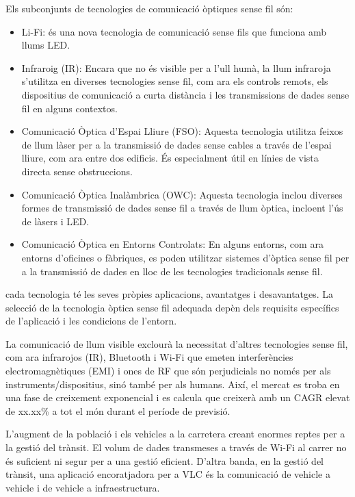 Els subconjunts de tecnologies de comunicació òptiques sense fil són:
\begin{itemize}
    \item Li-Fi: és una nova tecnologia de comunicació sense fils que funciona amb llums LED.
    \item Infraroig (IR): Encara que no és visible per a l'ull humà, la llum infraroja s'utilitza en diverses tecnologies sense fil, com ara els controls remots, els dispositius de comunicació a curta distància i les transmissions de dades sense fil en alguns contextos.
    \item Comunicació Òptica d'Espai Lliure (FSO): Aquesta tecnologia utilitza feixos de llum làser per a la transmissió de dades sense cables a través de l'espai lliure, com ara entre dos edificis. És especialment útil en línies de vista directa sense obstruccions.
    \item Comunicació Òptica Inalàmbrica (OWC): Aquesta tecnologia inclou diverses formes de transmissió de dades sense fil a través de llum òptica, incloent l'ús de làsers i LED.
    \item Comunicació Òptica en Entorns Controlats: En alguns entorns, com ara entorns d'oficines o fàbriques, es poden utilitzar sistemes d'òptica sense fil per a la transmissió de dades en lloc de les tecnologies tradicionals sense fil.
\end{itemize}

cada tecnologia té les seves pròpies aplicacions, avantatges i desavantatges. La selecció de la tecnologia òptica sense fil adequada depèn dels requisits específics de l'aplicació i les condicions de l'entorn.

La comunicació de llum visible exclourà la necessitat d'altres tecnologies sense fil, com ara infrarojos (IR), Bluetooth i Wi-Fi que emeten interferències electromagnètiques (EMI) i ones de RF que són perjudicials no només per als instruments/dispositius, sinó també per als humans. Així, el mercat es troba en una fase de creixement exponencial i es calcula que creixerà amb un CAGR elevat de xx.xx\% a tot el món durant el període de previsió.

L'augment de la població i els vehicles a la carretera creant enormes reptes per a la gestió del trànsit. El volum de dades transmeses a través de Wi-Fi al carrer no és suficient ni segur per a una gestió eficient. D'altra banda, en la gestió del trànsit, una aplicació encoratjadora per a VLC és la comunicació de vehicle a vehicle i de vehicle a infraestructura.

